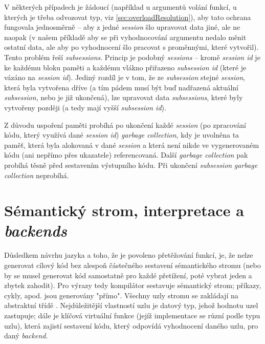 V některých případech je žádoucí (například u argumentů volání funkcí, u kterých je třeba odvozovat typ, viz \ref{sec:overloadResolution}), aby tato ochrana fungovala jednosměrně -- aby z jedné \textit{session} šlo upravovat data jiné, ale ne naopak (v našem příkladě aby se při vyhodnocování argumentu nedalo měnit ostatní data, ale aby po vyhodnocení šlo pracovat s proměnnými, které vytvořil). Tento problém řeší \textit{subsessions}. Princip je podobný \textit{sessions} -- kromě \textit{session id} je ke každému bloku paměti a každému vlákno přiřazeno \textit{subsession id} (které je vázáno na \textit{session id}). Jediný rozdíl je v tom, že ze \textit{subsession} stejné \textit{session}, která byla vytvořena dříve (a tím pádem musí být buď nadřazená aktuální \textit{subsession}, nebo je již ukončená), lze upravovat data \textit{subsessions}, které byly vytvořeny později (a tedy mají vyšší \textit{subsession id}).


Z důvodu uspoření paměti probíhá po ukončení každé \textit{session} (po zpracování kódu, který využívá dané \textit{session id}) \textit{garbage collection}, kdy je uvolněna ta paměť, která byla alokovaná v dané \textit{session} a která není nikde ve vygenerovaném kódu (ani nepřímo přes ukazatele) referencovaná. Další \textit{garbage collection} pak probíhá těsně před sestavením výstupního kódu. Při ukončení \textit{subsession} \textit{garbage collection} neprobíhá.

\section{Sémantický strom, interpretace a \textit{backends}}
Důsledkem návrhu jazyka a toho, že je povoleno přetěžování funkcí, je, že nelze generovat cílový kód bez alespoň částečného sestavení sémantického stromu (nebo by se musel generovat kód samostatně pro každé přetížení, poté vybrat jeden a zbytek zahodit). Pro výrazy tedy kompilátor sestavuje sémantický strom; příkazy, cykly, apod. jsou generovány "přímo". Všechny uzly stromu se zakládají na abstraktní třídě . Nejdůležitější vlastností uzlu je datový typ, jehož hodnotu uzel zastupuje; dále je klíčová virtuální funkce  (jejíž implementace se různí podle typu uzlu), která zajistí sestavení kódu, který odpovídá vyhodnocení daného uzlu, pro daný \textit{backend}.

